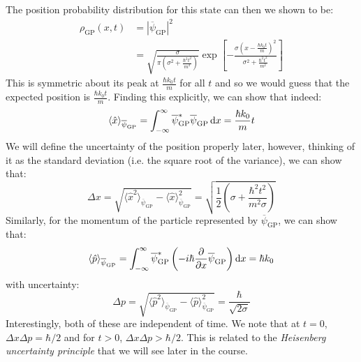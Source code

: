\documentclass[../main.tex]{subfiles}
\begin{document}
The position probability distribution for this state can then we shown to be:
\begin{align*}
  \rho_{\text{GP}}(x, t) &= |\overline{\psi}_{\text{GP}}|^2 \\
                         &= \sqrt{\frac{\sigma}{\pi\left(\sigma^2 + \frac{\hbar^2 t^2}{m^2}\right)}} \exp\left[-\frac{\sigma\left(x - \frac{\hbar k_0 t}{m}\right)^2}{\sigma^2 + \frac{\hbar^2 t^2}{m^2}}\right]
\end{align*}
This is symmetric about its peak at $\frac{\hbar k_0 t}{m}$ for all $t$ and so we would guess that the expected position is $\frac{\hbar k_0 t}{m}$.
Finding this explicitly, we can show that indeed:
\[
  \langle \hat{x} \rangle_{\overline{\psi}_{\text{GP}}} = \int_{-\infty}^{\infty} \overline{\psi}_{\text{GP}}^{*} \overline{\psi}_{\text{GP}} \d{x} = \frac{\hbar k_0}{m} t
\]
We will define the uncertainty of the position properly later, however, thinking of it as the standard deviation (i.e. the square root of the variance), we can show that:
\[
  \Delta x = \sqrt{\langle \hat{x}^2 \rangle_{\overline{\psi}_{\text{GP}}} - \langle \hat{x} \rangle^2_{\overline{\psi}_{\text{GP}}}} = \sqrt{\frac{1}{2}\left(\sigma + \frac{\hbar^2 t^2}{m^2 \sigma}\right)}
\]
Similarly, for the momentum of the particle represented by $\overline{\psi}_{\text{GP}}$, we can show that:
\[
  \langle \hat{p} \rangle_{\overline{\psi}_{\text{GP}}} = \int_{-\infty}^{\infty} \overline{\psi}_{\text{GP}}^{*} \left(-i \hbar \pderiv{}{x} \overline{\psi}_{\text{GP}}\right) \d{x} = \hbar k_0
\]
with uncertainty:
\[
  \Delta p = \sqrt{\langle \hat{p}^2 \rangle_{\overline{\psi}_{\text{GP}}} - \langle \hat{p} \rangle^2_{\overline{\psi}_{\text{GP}}}} = \frac{\hbar}{\sqrt{2\sigma}}
\]
Interestingly, both of these are independent of time.
We note that at $t = 0$, $\Delta x \Delta p = \hbar/2$ and for $t > 0$, $\Delta x \Delta p > \hbar / 2$.
This is related to the \textit{Heisenberg uncertainty principle} that we will see later in the course.
\end{document}

